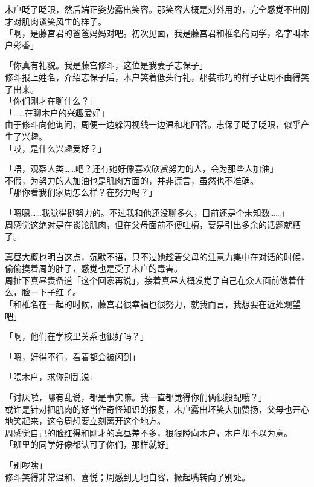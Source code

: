 木户眨了眨眼，然后端正姿势露出笑容。那笑容大概是对外用的，完全感觉不出刚才对肌肉谈笑风生的样子。\\

「啊，是藤宫君的爸爸妈妈对吧。初次见面，我是藤宫君和椎名的同学，名字叫木户彩香」

「你真有礼貌。我是藤宫修斗，这位是我妻子志保子」\\

修斗报上姓名，介绍志保子后，木户笑着低头行礼，那装乖巧的样子让周不由得笑了出来。\\

「你们刚才在聊什么？」\\

「……在聊木户的兴趣爱好」\\

由于修斗向他询问，周便一边躲闪视线一边温和地回答。志保子眨了眨眼，似乎产生了兴趣。\\

「哎，是什么兴趣爱好？」

「唔，观察人类……吧？还有她好像喜欢欣赏努力的人，会为那些人加油」\\

不假，为努力的人加油也是肌肉方面的，并非谎言，虽然也不准确。\\

「那你看我们家周怎么样？在努力吗？」

「嗯嗯……我觉得挺努力的。不过我和他还没聊多久，目前还是个未知数……」\\

周感觉这绝对是在谈论肌肉，但在父母面前不便吐槽，要是引出多余的话题就糟了。

真昼大概也明白这点，沉默不语，只不过她趁着父母的注意力集中在对话的时候，偷偷摸着周的肚子，感觉也是受了木户的毒害。\\

周扯下真昼责备道「这个回家再说」，接着真昼大概发觉了自己在众人面前做着什么，脸一下子红了。\\

「和椎名在一起的时候，藤宫君很幸福也很努力，就我而言，我想要在近处观望吧」

「啊，他们在学校里关系也很好吗？」

「嗯，好得不行，看着都会被闪到」

「喂木户，求你别乱说」

「讨厌啦，哪有乱说，都是事实嘛。我一直都觉得你们俩很般配哦？」\\

或许是针对把肌肉的好当作奇怪知识的报复，木户露出坏笑大加赞扬，父母也开心地笑起来，这令周想要立刻离开这个地方。\\

周感觉自己的脸红得和刚才的真昼差不多，狠狠瞪向木户，木户却不以为意。\\

「班里的同学好像都认可了你们，那样就好」

「别啰嗦」\\

修斗笑得非常温和、喜悦；周感到无地自容，撅起嘴转向了别处。

